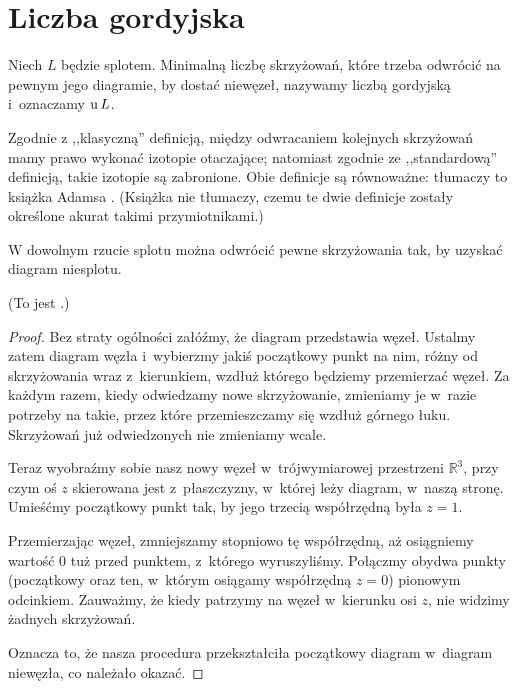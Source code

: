 
\section{Liczba gordyjska}
%

\begin{definition}
    Niech $L$ będzie splotem.
    Minimalną liczbę skrzyżowań, które trzeba odwrócić na pewnym jego diagramie, by dostać niewęzeł, nazywamy liczbą gordyjską i~oznaczamy $\operatorname{u} L$.
\end{definition}

Zgodnie z ,,klasyczną'' definicją, między odwracaniem kolejnych skrzyżowań mamy prawo wykonać izotopie otaczające; natomiast zgodnie ze ,,standardową'' definicją, takie izotopie są zabronione.
Obie definicje są równoważne: tłumaczy to książka Adamsa \cite[s. 58]{adams1994}.
(Książka nie tłumaczy, czemu te dwie definicje zostały określone akurat takimi przymiotnikami.)

\begin{lemma}
\label{lem:unknotting_well_defined}%
    W dowolnym rzucie splotu można odwrócić pewne skrzyżowania tak, by uzyskać diagram niesplotu.
\end{lemma}

(To jest \cite[ćwiczenie E 1.6, s. 15]{burde2014}.)

\begin{proof}
    Bez straty ogólności załóźmy, że diagram przedstawia węzeł.
    Ustalmy zatem diagram węzła i~wybierzmy jakiś początkowy punkt na nim, różny od skrzyżowania wraz z~kierunkiem, wzdłuż którego będziemy przemierzać węzeł.
    Za każdym razem, kiedy odwiedzamy nowe skrzyżowanie, zmieniamy je w~razie potrzeby na takie, przez które przemieszczamy się wzdłuż górnego łuku.
    Skrzyżowań już odwiedzonych nie zmieniamy wcale.

    Teraz wyobraźmy sobie nasz nowy węzeł w~trójwymiarowej przestrzeni $\mathbb R^3$, przy czym oś $z$ skierowana jest z~płaszczyzny, w~której leży diagram, w~naszą stronę.
    Umieśćmy początkowy punkt tak, by jego trzecią współrzędną była $z = 1$.

    Przemierzając węzeł, zmniejszamy stopniowo tę współrzędną, aż osiągniemy wartość $0$ tuż przed punktem, z~którego wyruszyliśmy.
    Połączmy obydwa punkty (początkowy oraz ten, w~którym osiągamy współrzędną $z = 0$) pionowym odcinkiem.
    Zauważmy, że kiedy patrzymy na węzeł w~kierunku osi $z$, nie widzimy żadnych skrzyżowań.

    Oznacza to, że nasza procedura przekształciła początkowy diagram w~diagram niewęzła, co należało okazać.
\end{proof}

